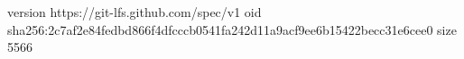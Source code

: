 version https://git-lfs.github.com/spec/v1
oid sha256:2c7af2e84fedbd866f4dfcccb0541fa242d11a9acf9ee6b15422becc31e6cee0
size 5566
